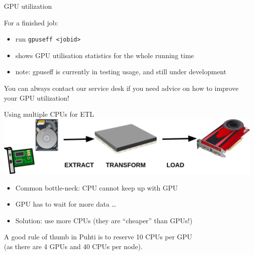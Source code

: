 \documentclass[aspectratio=1610,14pt]{beamer}
\newcommand{\vitem}{\vfill\item}
\begin{document}
\begin{frame}{GPU utilization}

  For a finished job:

  \begin{itemize}
  \vitem run {\tt gpuseff <jobid>}
  \vitem shows GPU utilisation statistics for the whole running time
  \vitem \alert{note:} gpuseff is currently in testing usage, and still
    under development
  \end{itemize}

  \vfill
  
  You can always contact our service desk if you need advice on how to
  improve your GPU utilization!
\end{frame}

\begin{frame}[fragile]{Using multiple CPUs for ETL}
  \includegraphics[width=\textwidth]{etl}

  \begin{itemize}
  \item Common bottle-neck: CPU cannot keep up with GPU
  \item GPU has to wait for more data \ldots
  \item Solution: use more CPUs (they are ``cheaper'' than GPUs!)
  \end{itemize}

  \vspace{0.5em}
  
  A good \alert{rule of thumb in Puhti is to reserve 10 CPUs per GPU} \\
  (as there are 4 GPUs and 40 CPUs per node).

\end{frame}
\end{document}
